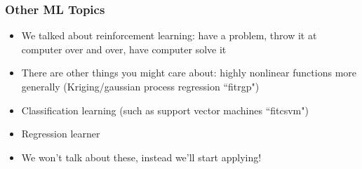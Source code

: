 \documentclass{beamer}
\begin{document}
\begin{frame}
\frametitle[alignment=center]{Other ML Topics}
\begin{itemize}
\item We talked about reinforcement learning: have a problem, throw it at computer over and over, have computer solve it
\bigskip
\item There are other things you might care about:  highly nonlinear functions more generally (Kriging/gaussian process regression ``fitrgp")
\bigskip
\item Classification learning (such as support vector machines ``fitcsvm")
\bigskip
\item Regression learner
\bigskip
\item We won't talk about these, instead we'll start applying!
\end{itemize}
\end{frame}
\end{document}
